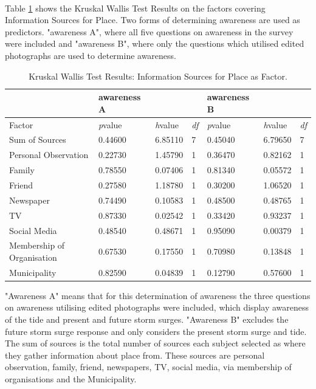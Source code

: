 \paragraph{}

Table \ref{kw_test_info_place} shows the Kruskal Wallis Test Results on the factors covering Information Sources for Place. Two forms of determining awareness are used as predictors. "awareness A", where all five questions on awareness in the survey were included and "awareness B", where only the questions which utilised edited photographs are used to determine awareness.

\begin{table}[H]
    \centering
    \begin{tabular}{|l|l|l|l|l|l|l|}
    \hline
       & \textbf{awareness A} & ~ & ~ & \textbf{awareness B} & ~ & ~ \\ \hline
       Factor &\textit{p}value &\textit{h}value & \textit{df} &\textit{p}value &\textit{h}value & \textit{df} \\ \hline
        Sum of Sources  & 0.44600 & 6.85110 & 7 & 0.45040 & 6.79650 & 7 \\ \hline
        Personal Observation & 0.22730 & 1.45790 & 1 & 0.36470 & 0.82162 & 1 \\ \hline
        Family & 0.78550 & 0.07406 & 1 & 0.81340 & 0.05572 & 1 \\ \hline
        Friend & 0.27580 & 1.18780 & 1 & 0.30200 & 1.06520 & 1 \\ \hline
        Newspaper & 0.74490 & 0.10583 & 1 & 0.48500 & 0.48765 & 1 \\ \hline
        TV & 0.87330 & 0.02542 & 1 & 0.33420 & 0.93237 & 1 \\ \hline
        Social Media & 0.48540 & 0.48671 & 1 & 0.95090 & 0.00379 & 1 \\ \hline
        Membership of Organisation  & 0.67530 & 0.17550 & 1 & 0.70980 & 0.13848 & 1 \\ \hline
        Municipality & 0.82590 & 0.04839 & 1 & 0.12790 & 0.57600 & 1 \\ \hline
        \hline
    \end{tabular}
    \caption{Kruskal Wallis Test Results: Information Sources for Place as Factor.}{  "Awareness A" means that for this determination of awareness the three questions on awareness utilising edited photographs were included, which display awareness of the tide and present and future storm surges.  "Awareness B" excludes the future storm surge response and only considers the present storm surge and tide.  The sum of sources is the total number of sources each subject selected as where they gather information about place from. These sources are personal observation, family, friend, newspapers, TV, social media, via membership of organisations and the Municipality. }
    \label{kw_test_info_place}
\end{table}


